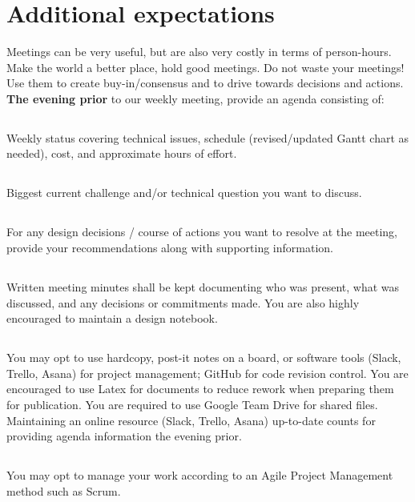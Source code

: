 \documentclass[10pt,courier]{navymemo}
\begin{document}
\section{Additional expectations}  Meetings can be very useful, but are also very costly in terms of person-hours.  Make the world a better place, hold good meetings.  Do not waste your meetings! Use them to create buy-in/consensus and to drive towards decisions and actions.  \textbf{The evening prior} to our weekly meeting, provide an agenda consisting of:
\subsection{} Weekly status covering technical issues, schedule (revised/updated Gantt chart as needed), cost, and approximate hours of effort. 
\subsection{} Biggest current challenge and/or technical question you want to discuss.
\subsection{} For any design decisions / course of actions you want to resolve at the meeting, provide your recommendations along with supporting information.
\subsection{} Written meeting minutes shall be kept documenting who was present, what was discussed, and any decisions or commitments made.  You are also highly encouraged to maintain a design notebook. 
\subsection{} You may opt to use hardcopy, post-it notes on a board, or software tools (Slack, Trello, Asana) for project management; GitHub for code revision control. You are encouraged to use Latex for documents to reduce rework when preparing them for publication. You are required to use Google Team Drive for shared files. Maintaining an online resource (Slack, Trello, Asana) up-to-date counts for providing agenda information the evening prior. 
\subsection{} You may opt to manage your work according to an Agile Project Management method such as Scrum. 
\end{document}
